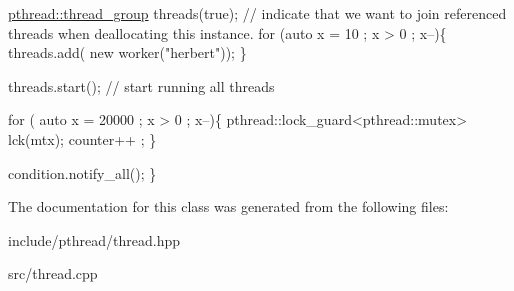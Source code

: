 \begin{DoxyPre}{\ttfamily   \hyperlink{classpthread_1_1thread__group}{pthread::thread\_group} threads(true); // indicate that we want to join referenced threads when deallocating this instance.
  for (auto x = 10 ; x > 0 ; x--)\{
    threads.add( new worker("herbert"));
  \}}\end{DoxyPre}



\begin{DoxyPre}{\ttfamily   threads.start(); // start running all threads}\end{DoxyPre}



\begin{DoxyPre}{\ttfamily   for ( auto x = 20000 ; x > 0 ; x--)\{
    pthread::lock\_guard<pthread::mutex> lck(mtx);
    counter++ ;
  \}}\end{DoxyPre}



\begin{DoxyPre}{\ttfamily   condition.notify\_all();
\}}\end{DoxyPre}



\begin{DoxyPre}{\ttfamily   }\end{DoxyPre}
 

The documentation for this class was generated from the following files\+:\begin{DoxyCompactItemize}
\item 
include/pthread/thread.\+hpp\item 
src/thread.\+cpp\end{DoxyCompactItemize}
